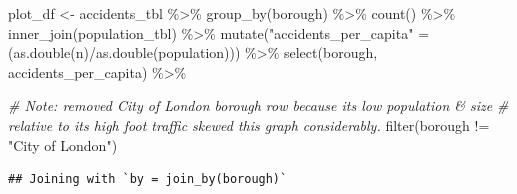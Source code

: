 \documentclass[
]{article}
\newenvironment{Shaded}{\begin{snugshade}}{\end{snugshade}}
\newcommand{\CommentTok}[1]{\textcolor[rgb]{0.56,0.35,0.01}{\textit{#1}}}
\newcommand{\FunctionTok}[1]{\textcolor[rgb]{0.00,0.00,0.00}{#1}}
\newcommand{\NormalTok}[1]{#1}
\newcommand{\OtherTok}[1]{\textcolor[rgb]{0.56,0.35,0.01}{#1}}
\newcommand{\SpecialCharTok}[1]{\textcolor[rgb]{0.00,0.00,0.00}{#1}}
\newcommand{\StringTok}[1]{\textcolor[rgb]{0.31,0.60,0.02}{#1}}
\begin{document}
\begin{Shaded}
\begin{Highlighting}[]
\NormalTok{plot\_df }\OtherTok{\textless{}{-}}\NormalTok{ accidents\_tbl }\SpecialCharTok{\%\textgreater{}\%} 
    \FunctionTok{group\_by}\NormalTok{(borough) }\SpecialCharTok{\%\textgreater{}\%} 
    \FunctionTok{count}\NormalTok{() }\SpecialCharTok{\%\textgreater{}\%}
    \FunctionTok{inner\_join}\NormalTok{(population\_tbl) }\SpecialCharTok{\%\textgreater{}\%}
    \FunctionTok{mutate}\NormalTok{(}\StringTok{"accidents\_per\_capita"} \OtherTok{=}\NormalTok{ (}\FunctionTok{as.double}\NormalTok{(n)}\SpecialCharTok{/}\FunctionTok{as.double}\NormalTok{(population))) }\SpecialCharTok{\%\textgreater{}\%}
    \FunctionTok{select}\NormalTok{(borough, accidents\_per\_capita) }\SpecialCharTok{\%\textgreater{}\%}
    
    \CommentTok{\# Note: removed City of London borough row because its low population \& size }
    \CommentTok{\# relative to its high foot traffic skewed this graph considerably.}
    \FunctionTok{filter}\NormalTok{(borough }\SpecialCharTok{!=} \StringTok{"City of London"}\NormalTok{)}
\end{Highlighting}
\end{Shaded}

\begin{verbatim}
## Joining with `by = join_by(borough)`
\end{verbatim}
\end{document}
